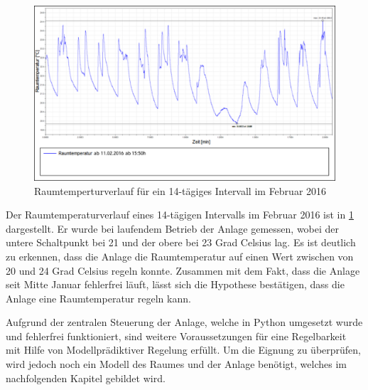 \begin{figure}
\centering
\includegraphics[width=\textwidth]{abbildungen/20160330_regelung}
\caption{Raumtemperturverlauf für ein 14-tägiges Intervall im Februar 2016}
\label{fig:regelung}
\end{figure}

Der Raumtemperaturverlauf eines 14-tägigen Intervalls im Februar 2016 ist in \ref{fig:regelung} dargestellt. Er wurde bei laufendem Betrieb der Anlage gemessen, wobei der untere Schaltpunkt bei 21 und der obere bei 23 Grad Celsius lag. Es ist deutlich zu erkennen, dass die Anlage die Raumtemperatur auf einen Wert zwischen von 20 und 24 Grad Celsius regeln konnte. Zusammen mit dem Fakt, dass die Anlage seit Mitte Januar fehlerfrei läuft, lässt sich die Hypothese bestätigen, dass die Anlage eine Raumtemperatur regeln kann.

Aufgrund der zentralen Steuerung der Anlage, welche in Python umgesetzt wurde und fehlerfrei funktioniert, sind weitere Voraussetzungen für eine Regelbarkeit mit Hilfe von Modellprädiktiver Regelung erfüllt. Um die Eignung zu überprüfen, wird jedoch noch ein Modell des Raumes und der Anlage benötigt, welches im nachfolgenden Kapitel gebildet wird.